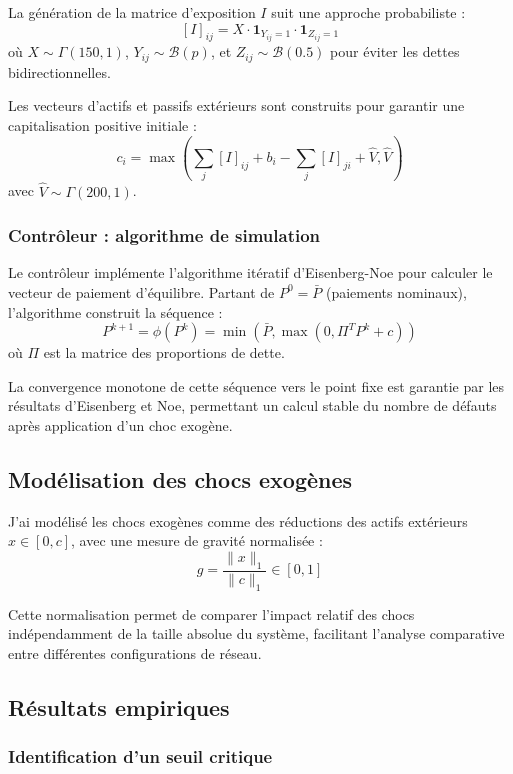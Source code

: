 \documentclass[12pt,a4paper,twoside]{article}
\begin{document}
La génération de la matrice d'exposition $I$ suit une approche probabiliste :
$$[I]_{ij} = X \cdot \mathbf{1}_{Y_{ij}=1} \cdot \mathbf{1}_{Z_{ij}=1}$$
où $X \sim \Gamma(150,1)$, $Y_{ij} \sim \mathcal{B}(p)$, et $Z_{ij} \sim \mathcal{B}(0.5)$ pour éviter les dettes bidirectionnelles.

Les vecteurs d'actifs et passifs extérieurs sont construits pour garantir une capitalisation positive initiale :
$$c_i = \max\left(\sum_j [I]_{ij} + b_i - \sum_j [I]_{ji} + \hat{V}, \hat{V}\right)$$
avec $\hat{V} \sim \Gamma(200,1)$.

\subsubsection{Contrôleur : algorithme de simulation}

Le contrôleur implémente l'algorithme itératif d'Eisenberg-Noe pour calculer le vecteur de paiement d'équilibre. Partant de $P^0 = \bar{P}$ (paiements nominaux), l'algorithme construit la séquence :
$$P^{k+1} = \phi(P^k) = \min(\bar{P}, \max(0, \Pi^T P^k + c))$$
où $\Pi$ est la matrice des proportions de dette.

La convergence monotone de cette séquence vers le point fixe est garantie par les résultats d'Eisenberg et Noe, permettant un calcul stable du nombre de défauts après application d'un choc exogène.

\subsection{Modélisation des chocs exogènes}

J'ai modélisé les chocs exogènes comme des réductions des actifs extérieurs $x \in [0,c]$, avec une mesure de gravité normalisée :
$$g = \frac{\|x\|_1}{\|c\|_1} \in [0,1]$$

Cette normalisation permet de comparer l'impact relatif des chocs indépendamment de la taille absolue du système, facilitant l'analyse comparative entre différentes configurations de réseau.

\subsection{Résultats empiriques}

\subsubsection{Identification d'un seuil critique}
\end{document}
